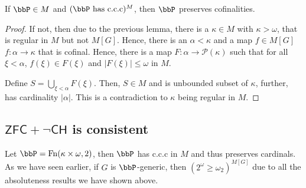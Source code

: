 \begin{theorem}
    If $\bbP\in M$ and $(\bbP\text{ has c.c.c})^M$, then $\bbP$ preserves cofinalities.
\end{theorem}
\begin{proof}
    If not, then due to the previous lemma, there is a $\kappa\in M$ with $\kappa > \omega$, that is regular in $M$ but not $M[G]$. Hence, there is an $\alpha < \kappa$ and a map $f\in M[G]$ $f:\alpha\to\kappa$ that is cofinal. Hence, there is a map $F:\alpha\to\mathscr P(\kappa)$ such that for all $\xi < \alpha$, $f(\xi)\in F(\xi)$ and $|F(\xi)|\le\omega$ in $M$. 

    Define $S = \bigcup_{\xi < \alpha} F(\xi)$. Then, $S\in M$ and is unbounded subset of $\kappa$, further, has cardinality $|\alpha|$. This is a contradiction to $\kappa$ being regular in $M$.
\end{proof}

\subsection{\texorpdfstring{$\mathsf{ZFC} + \neg\mathsf{CH}$}{} is consistent}

Let $\bbP = \Fn(\kappa\times\omega, 2)$, then $\bbP$ has c.c.c in $M$ and thus preserves cardinals. As we have seen earlier, if $G$ is $\bbP$-generic, then $(2^\omega\ge\omega_2)^{M[G]}$ due to all the absoluteness results we have shown above.